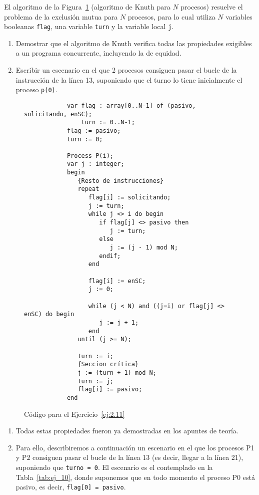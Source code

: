 \begin{ejercicio}\label{ej:2.11}
    El algoritmo de la Figura~\ref{fig:cod_11} (algoritmo de Knuth para $N$ procesos) resuelve el problema de la exclusión mutua para $N$ procesos, para lo cual utiliza $N$ variables booleanas \verb|flag|, una variable \verb|turn| y la variable local \verb|j|.
    \begin{enumerate}[label=(\alph*)]
        \item Demostrar que el algoritmo de Knuth verifica todas las propiedades exigibles a un programa concurrente, incluyendo la de equidad.
        \item Escribir un escenario en el que 2 procesos consiguen pasar el bucle de la instrucción de la línea 13, suponiendo que el turno lo tiene inicialmente el proceso \verb|p(0)|.
    \end{enumerate}

    \begin{figure}
        \centering
        \begin{verbatim}
            var flag : array[0..N-1] of (pasivo, solicitando, enSC);
                turn := 0..N-1;
            flag := pasivo;
            turn := 0;

            Process P(i);
            var j : integer;
            begin
               {Resto de instrucciones}
               repeat
                  flag[i] := solicitando;
                  j := turn;
                  while j <> i do begin
                     if flag[j] <> pasivo then
                        j := turn;
                     else
                        j := (j - 1) mod N;
                     endif;
                  end

                  flag[i] := enSC;
                  j := 0;

                  while (j < N) and ((j=i) or flag[j] <> enSC) do begin
                     j := j + 1;
                  end
               until (j >= N);

               turn := i;
               {Seccion crítica}
               j := (turn + 1) mod N;
               turn := j;
               flag[i] := pasivo;
            end
        \end{verbatim}
        \caption{Código para el Ejercicio~\ref{ej:2.11}}
        \label{fig:cod_11}
    \end{figure}
    \begin{enumerate}[label=(\alph*)]
        \item Todas estas propiedades fueron ya demostradas en los apuntes de teoría.
        \item Para ello, describiremos a continuación un escenario en el que los procesos P1 y P2 consiguen pasar el bucle de la línea 13 (es decir, llegar a la línea 21), suponiendo que \verb|turno = 0|. El escenario es el contemplado en la Tabla~\ref{tab:ej_10}, donde suponemos que en todo momento el proceso P0 está pasivo, es decir, \verb|flag[0] = pasivo|.


\end{enumerate}
\end{ejercicio}
